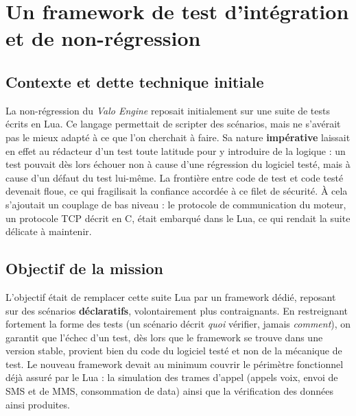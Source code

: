 \section{Un framework de test d'intégration et de non-régression}
\label{chap:t3}


\subsection{Contexte et dette technique initiale}
La non-régression du \emph{Valo Engine} reposait initialement sur une suite de
tests écrits en Lua. Ce langage permettait de scripter des scénarios, mais ne
s'avérait pas le mieux adapté à ce que l'on cherchait à faire. Sa nature
\textbf{impérative} laissait en effet au rédacteur d'un test toute latitude pour
y introduire de la logique : un test pouvait dès lors échouer non à cause d'une
régression du logiciel testé, mais à cause d'un défaut du test lui-même. La
frontière entre code de test et code testé devenait floue, ce qui fragilisait la
confiance accordée à ce filet de sécurité. À cela s'ajoutait un couplage de bas
niveau : le protocole de communication du moteur, un protocole TCP décrit en C,
était embarqué dans le Lua, ce qui rendait la suite délicate à maintenir.

\subsection{Objectif de la mission}
L'objectif était de remplacer cette suite Lua par un framework dédié, reposant
sur des scénarios \textbf{déclaratifs}, volontairement plus contraignants. En
restreignant fortement la forme des tests (un scénario décrit \emph{quoi}
vérifier, jamais \emph{comment}), on garantit que l'échec d'un test, dès lors
que le framework se trouve dans une version stable, provient bien du code du
logiciel testé et non de la mécanique de test. Le nouveau framework devait au
minimum couvrir le périmètre fonctionnel déjà assuré par le Lua : la simulation
des trames d'appel (appels voix, envoi de SMS et de MMS, consommation de data)
ainsi que la vérification des données ainsi produites.

